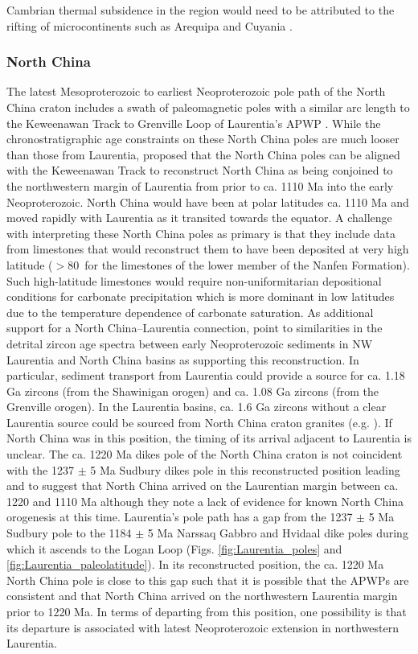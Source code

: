 \documentclass[twocolumn, switch]{article} %
\begin{document}
Cambrian thermal subsidence in the region would need to be attributed to the rifting of microcontinents such as Arequipa and Cuyania \citep{Escayola2011a, Martin2019a}.

\subsubsection{North China}

The latest Mesoproterozoic to earliest Neoproterozoic pole path of the North China craton includes a swath of paleomagnetic poles with a similar arc length to the Keweenawan Track to Grenville Loop of Laurentia's APWP \citep{Zhao2019a, Zhang2021a}. While the chronostratigraphic age constraints on these North China poles are much looser than those from Laurentia, \cite{Zhao2019a} proposed that the North China poles can be aligned with the Keweenawan Track to reconstruct North China as being conjoined to the northwestern margin of Laurentia from prior to ca. 1110 Ma into the early Neoproterozoic. North China would have been at polar latitudes ca. 1110 Ma and moved rapidly with Laurentia as it transited towards the equator. A challenge with interpreting these North China poles as primary is that they include data from limestones that would reconstruct them to have been deposited at very high latitude ($>$80\textdegree\ for the limestones of the lower member of the Nanfen Formation). Such high-latitude limestones would require non-uniformitarian depositional conditions for carbonate precipitation which is more dominant in low latitudes due to the temperature dependence of carbonate saturation. As additional support for a North China--Laurentia connection, \cite{Zhao2019a} point to similarities in the detrital zircon age spectra between early Neoproterozoic sediments in NW Laurentia and North China basins as supporting this reconstruction. In particular, sediment transport from Laurentia could provide a source for ca. 1.18 Ga zircons (from the Shawinigan orogen) and ca. 1.08 Ga zircons (from the Grenville orogen). In the Laurentia basins, ca. 1.6 Ga zircons without a clear Laurentia source could be sourced from North China craton granites (e.g. \citealp{Wang2020a}). If North China was in this position, the timing of its arrival adjacent to Laurentia is unclear. The ca. 1220 Ma dikes pole of the North China craton is not coincident with the 1237 $\pm$ 5 Ma Sudbury dikes pole in this reconstructed position leading \cite{Zhao2019a} and \cite{Zhang2021a} to suggest that North China arrived on the Laurentian margin between ca. 1220 and 1110 Ma although they note a lack of evidence for known North China orogenesis at this time. Laurentia's pole path has a gap from the 1237 $\pm$ 5 Ma Sudbury pole to the 1184 $\pm$ 5 Ma Narssaq Gabbro and Hvidaal dike poles during which it ascends to the Logan Loop (Figs. \ref{fig:Laurentia_poles} and \ref{fig:Laurentia_paleolatitude}). In its reconstructed position, the ca. 1220 Ma North China pole is close to this gap such that it is possible that the APWPs are consistent and that North China arrived on the northwestern Laurentia margin prior to 1220 Ma. In terms of departing from this position, one possibility is that its departure is associated with latest Neoproterozoic extension in northwestern Laurentia.
\end{document}
